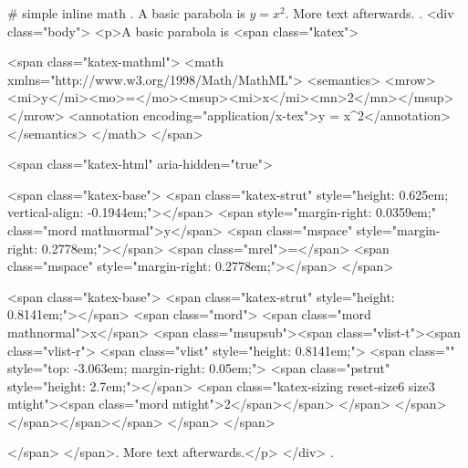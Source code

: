 #
simple inline math
.
A basic parabola is $y = x^2$. More text afterwards.
.
<div class="body">
<p>A basic parabola is <span class="katex">

<span class="katex-mathml">
<math xmlns="http://www.w3.org/1998/Math/MathML">
<semantics>
<mrow><mi>y</mi><mo>=</mo><msup><mi>x</mi><mn>2</mn></msup></mrow>
<annotation encoding="application/x-tex">y = x^2</annotation>
</semantics>
</math>
</span>

<span class="katex-html" aria-hidden="true">

<span class="katex-base">
<span class="katex-strut" style="height: 0.625em; vertical-align: -0.1944em;"></span>
<span style="margin-right: 0.0359em;" class="mord mathnormal">y</span>
<span class="mspace" style="margin-right: 0.2778em;"></span>
<span class="mrel">=</span>
<span class="mspace" style="margin-right: 0.2778em;"></span>
</span>

<span class="katex-base">
<span class="katex-strut" style="height: 0.8141em;"></span>
<span class="mord">
<span class="mord mathnormal">x</span>
<span class="msupsub"><span class="vlist-t"><span class="vlist-r">
<span class="vlist" style="height: 0.8141em;">
<span class="" style="top: -3.063em; margin-right: 0.05em;">
<span class="pstrut" style="height: 2.7em;"></span>
<span class="katex-sizing reset-size6 size3 mtight"><span class="mord mtight">2</span></span>
</span>
</span>
</span></span></span>
</span>
</span>

</span>
</span>. More text afterwards.</p>
</div>
.


